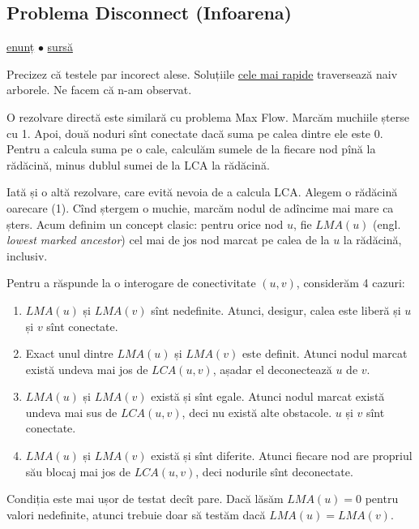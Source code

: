 \documentclass[../main.tex]{subfiles}
\begin{document}
\subsection{Problema Disconnect (Infoarena)}
\label{problem:disconnect}

\href{https://www.infoarena.ro/problema/disconnect}{enunț}
$\bullet$
\hyperref[code:disconnect]{sursă}

Precizez că testele par incorect alese. Soluțiile \href{https://www.infoarena.ro/statistici_problema?task=disconnect}{cele mai rapide} traversează naiv arborele. Ne facem că n-am observat. 

O rezolvare directă este similară cu problema Max Flow. Marcăm muchiile șterse cu 1. Apoi, două noduri sînt conectate dacă suma pe calea dintre ele este 0. Pentru a calcula suma pe o cale, calculăm sumele de la fiecare nod pînă la rădăcină, minus dublul sumei de la LCA la rădăcină.

Iată și o altă rezolvare, care evită nevoia de a calcula LCA. Alegem o rădăcină oarecare (1). Cînd ștergem o muchie, marcăm nodul de adîncime mai mare ca șters. Acum definim un concept clasic: pentru orice nod $u$, fie $LMA(u)$ (engl. \textit{lowest marked ancestor}) cel mai de jos nod marcat pe calea de la $u$ la rădăcină, inclusiv.

Pentru a răspunde la o interogare de conectivitate $(u,v)$, considerăm 4 cazuri:

\begin{enumerate}
  \item $LMA(u)$ și $LMA(v)$ sînt nedefinite. Atunci, desigur, calea este liberă și $u$ și $v$ sînt conectate.

  \item Exact unul dintre $LMA(u)$ și $LMA(v)$ este definit. Atunci nodul marcat există undeva mai jos de $LCA(u,v)$, așadar el deconectează $u$ de $v$.

  \item $LMA(u)$ și $LMA(v)$ există și sînt egale. Atunci nodul marcat există undeva mai sus de $LCA(u,v)$, deci nu există alte obstacole. $u$ și $v$ sînt conectate.

  \item $LMA(u)$ și $LMA(v)$ există și sînt diferite. Atunci fiecare nod are propriul său blocaj mai jos de $LCA(u,v)$, deci nodurile sînt deconectate.
\end{enumerate}

Condiția este mai ușor de testat decît pare. Dacă lăsăm $LMA(u) = 0$ pentru valori nedefinite, atunci trebuie doar să testăm dacă $LMA(u) = LMA(v)$.
\end{document}
